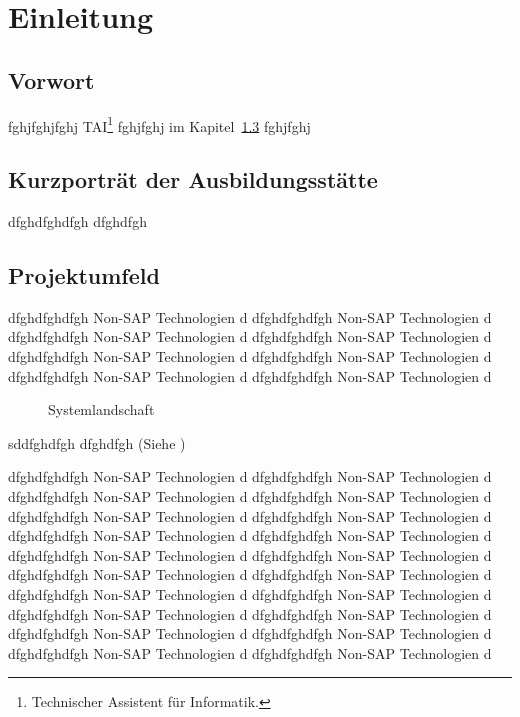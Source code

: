 \section{Einleitung}
\label{sec:Einleitung}

\subsection{Vorwort}
\label{sub:Vorwort}
fghjfghjfghj TAI\footnote{Technischer Assistent für Informatik.} fghjfghj im Kapitel~\ref{sub:Projektumfeld} fghjfghj

\subsection{Kurzporträt der Ausbildungsstätte}
\label{sub:Kurzporträt der Ausbildungsstätte}
dfghdfghdfgh  dfghdfgh

\begingroup
\setlength\intextsep{0pt}

\subsection{Projektumfeld}
\label{sub:Projektumfeld}
dfghdfghdfgh Non-SAP Technologien d dfghdfghdfgh Non-SAP Technologien d
dfghdfghdfgh Non-SAP Technologien d dfghdfghdfgh Non-SAP Technologien d
dfghdfghdfgh Non-SAP Technologien d dfghdfghdfgh Non-SAP Technologien d
dfghdfghdfgh Non-SAP Technologien d dfghdfghdfgh Non-SAP Technologien d

\begin{figure}
    \caption{Systemlandschaft}
    \label{app:Systemlandschaft}
\end{figure}
sddfghdfgh \zB dfghdfgh (Siehe )

dfghdfghdfgh Non-SAP Technologien d dfghdfghdfgh Non-SAP Technologien d
dfghdfghdfgh Non-SAP Technologien d dfghdfghdfgh Non-SAP Technologien d
dfghdfghdfgh Non-SAP Technologien d dfghdfghdfgh Non-SAP Technologien d
dfghdfghdfgh Non-SAP Technologien d dfghdfghdfgh Non-SAP Technologien d
dfghdfghdfgh Non-SAP Technologien d dfghdfghdfgh Non-SAP Technologien d
dfghdfghdfgh Non-SAP Technologien d dfghdfghdfgh Non-SAP Technologien d
dfghdfghdfgh Non-SAP Technologien d dfghdfghdfgh Non-SAP Technologien d
dfghdfghdfgh Non-SAP Technologien d dfghdfghdfgh Non-SAP Technologien d
dfghdfghdfgh Non-SAP Technologien d dfghdfghdfgh Non-SAP Technologien d
dfghdfghdfgh Non-SAP Technologien d dfghdfghdfgh Non-SAP Technologien d

